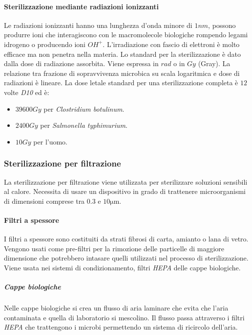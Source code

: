 			\paragraph{Sterilizzazione mediante radiazioni ionizzanti}
			Le radiazioni ionizzanti hanno una lunghezza d'onda minore di $1 nm$, possono produrre ioni che interagiscono con le macromolecole biologiche rompendo legami idrogeno o producendo ioni \emph{$OH^+$}.
			L'irradiazione con fascio di elettroni \`e molto efficace ma non penetra nella materia.
			Lo standard per la sterilizzazione \`e dato dalla dose di radiazione assorbita.
			Viene espressa in $\si{rad}$ o in $\si{Gy}$ (Gray).
			La relazione tra frazione di sopravvivenza microbica su scala logaritmica e dose di radiazioni \`e lineare.
			La dose letale standard per una sterilizzazione completa \`e $12$ volte \emph{D10} ed \`e:
			\begin{multicols}{2}
    				\begin{itemize}
        				\item $39600 Gy$ per \textit{Clostridium botulinum}. 
        				\item $2400 Gy$ per \textit{Salmonella typhimurium}.
        				\item $10 Gy$ per l'uomo.
    				\end{itemize}
			\end{multicols}

		\subsubsection{Sterilizzazione per filtrazione}
		La sterilizzazione per filtrazione viene utilizzata per sterilizzare soluzioni sensibili al calore.
		Necessita di usare un dispositivo in grado di trattenere microorganismi di dimensioni comprese tra $0.3$ e $10\si{\micro\metre}$.

			\paragraph{Filtri a spessore}
			I filtri a spessore sono costituiti da strati fibrosi di carta, amianto o lana di vetro.
			Vengono usati come pre-filtri per la rimozione delle particelle di maggiore dimensione che potrebbero intasare quelli utilizzati nel processo di sterilizzazione.
			Viene usata nei sistemi di condizionamento, filtri \emph{HEPA} delle cappe biologiche.
			
				\subparagraph{Cappe biologiche}
				Nelle cappe biologiche si crea un flusso di aria laminare che evita che l'aria contaminata e quella di laboratorio si mescolino.
				Il flusso passa attraverso i filtri \emph{HEPA} che trattengono i microbi permettendo un sistema di ricircolo dell'aria.

